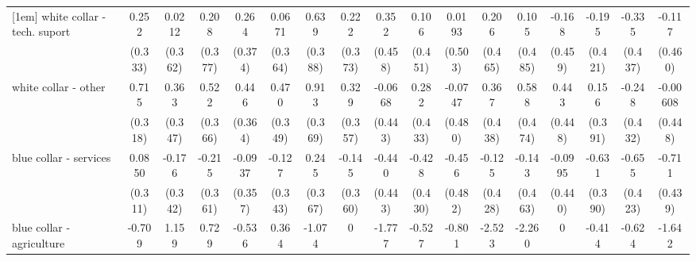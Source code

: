 {\begin{tabular}{l*{16}{c}}
[1em]
white collar - tech. suport&       0.252         &      0.0212         &       0.208         &       0.264         &      0.0671         &       0.639         &       0.222         &       0.352         &       0.106         &      0.0193         &       0.206         &       0.105         &      -0.168         &      -0.195         &      -0.335         &      -0.117         \\
                    &     (0.333)         &     (0.362)         &     (0.377)         &     (0.374)         &     (0.364)         &     (0.388)         &     (0.373)         &     (0.458)         &     (0.451)         &     (0.503)         &     (0.465)         &     (0.485)         &     (0.459)         &     (0.421)         &     (0.437)         &     (0.460)         \\
[1em]
white collar - other&       0.715\sym{*}  &       0.363         &       0.522         &       0.446         &       0.470         &       0.913\sym{*}  &       0.329         &     -0.0668         &       0.282         &     -0.0747         &       0.367         &       0.588         &       0.443         &       0.156         &      -0.248         &    -0.00608         \\
                    &     (0.318)         &     (0.347)         &     (0.366)         &     (0.364)         &     (0.349)         &     (0.369)         &     (0.357)         &     (0.443)         &     (0.433)         &     (0.480)         &     (0.438)         &     (0.474)         &     (0.448)         &     (0.391)         &     (0.432)         &     (0.448)         \\
[1em]
blue collar - services&      0.0850         &      -0.176         &      -0.215         &     -0.0937         &      -0.127         &       0.245         &      -0.145         &      -0.440         &      -0.428         &      -0.456         &      -0.125         &      -0.143         &     -0.0995         &      -0.631         &      -0.655         &      -0.711         \\
                    &     (0.311)         &     (0.342)         &     (0.361)         &     (0.357)         &     (0.343)         &     (0.367)         &     (0.360)         &     (0.443)         &     (0.430)         &     (0.482)         &     (0.428)         &     (0.463)         &     (0.440)         &     (0.390)         &     (0.423)         &     (0.439)         \\
[1em]
blue collar - agriculture&      -0.709         &       1.159         &       0.729         &      -0.536         &       0.364         &      -1.074         &           0         &      -1.777         &      -0.527         &      -0.801         &      -2.523\sym{*}  &      -2.260         &           0         &      -0.414         &      -0.624         &      -1.642         \\

\end{tabular}}

